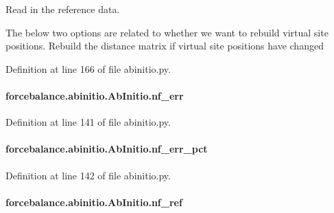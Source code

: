Read in the reference data. 

The below two options are related to whether we want to rebuild virtual site positions. Rebuild the distance matrix if virtual site positions have changed 

Definition at line 166 of file abinitio.\-py.

\hypertarget{classforcebalance_1_1abinitio_1_1AbInitio_a89de620e9aa500481c9e1ded99e14f72}{
\paragraph[{nf\-\_\-err}]{\setlength{\rightskip}{0pt plus 5cm}forcebalance.\-abinitio.\-Ab\-Initio.\-nf\-\_\-err\hspace{0.3cm}{\ttfamily [inherited]}}}\label{classforcebalance_1_1abinitio_1_1AbInitio_a89de620e9aa500481c9e1ded99e14f72}


Definition at line 141 of file abinitio.\-py.

\hypertarget{classforcebalance_1_1abinitio_1_1AbInitio_a184edac2cb27a999c363595ea59d8163}{
\paragraph[{nf\-\_\-err\-\_\-pct}]{\setlength{\rightskip}{0pt plus 5cm}forcebalance.\-abinitio.\-Ab\-Initio.\-nf\-\_\-err\-\_\-pct\hspace{0.3cm}{\ttfamily [inherited]}}}\label{classforcebalance_1_1abinitio_1_1AbInitio_a184edac2cb27a999c363595ea59d8163}


Definition at line 142 of file abinitio.\-py.

\hypertarget{classforcebalance_1_1abinitio_1_1AbInitio_a5a77f4b99a5b01245ab0435d632122a1}{
\paragraph[{nf\-\_\-ref}]{\setlength{\rightskip}{0pt plus 5cm}forcebalance.\-abinitio.\-Ab\-Initio.\-nf\-\_\-ref\hspace{0.3cm}{\ttfamily [inherited]}}}\label{classforcebalance_1_1abinitio_1_1AbInitio_a5a77f4b99a5b01245ab0435d632122a1}


